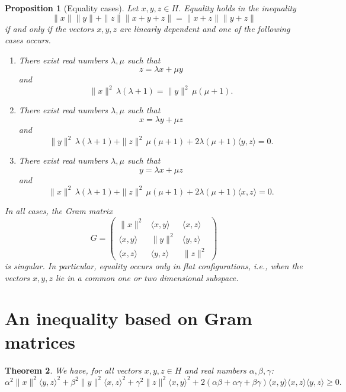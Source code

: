 \documentclass[a4paper,10pt]{article}
\theoremstyle{plain}
\newtheorem{theorem}{Theorem}[section]
\newtheorem{proposition}[theorem]{Proposition}
\theoremstyle{definition}
\theoremstyle{remark}
\begin{document}
\begin{proposition}[Equality cases]
\label{proposition-equality-case}
Let $x,y,z\in H$.
Equality holds in the inequality
\[
\|x\|\|y\|+\|z\|\|x+y+z\|=\|x+z\|\|y+z\|
\]
if and only if the vectors $x,y,z$ are linearly dependent and one of the following cases occurs.

\begin{enumerate}
\item[\textup{(i)}]
There exist real numbers $\lambda,\mu$ such that
\[
z=\lambda x+\mu y
\]
and
\[
\|x\|^{2}\,\lambda(\lambda+1)
=
\|y\|^{2}\,\mu(\mu+1).
\]

\item[\textup{(ii)}]
There exist real numbers $\lambda,\mu$ such that
\[
x=\lambda y+\mu z
\]
and
\[
\|y\|^{2}\,\lambda(\lambda+1)
+
\|z\|^{2}\,\mu(\mu+1)
+
2\lambda(\mu+1)\langle y,z\rangle
=0.
\]

\item[\textup{(iii)}]
There exist real numbers $\lambda,\mu$ such that
\[
y=\lambda x+\mu z
\]
and
\[
\|x\|^{2}\,\lambda(\lambda+1)
+
\|z\|^{2}\,\mu(\mu+1)
+
2\lambda(\mu+1)\langle x,z\rangle
=0.
\]
\end{enumerate}

In all cases, the Gram matrix
\[
G=
\begin{pmatrix}
\|x\|^2 & \langle x,y\rangle & \langle x,z\rangle\\
\langle x,y\rangle & \|y\|^2 & \langle y,z\rangle\\
\langle x,z\rangle & \langle y,z\rangle & \|z\|^2
\end{pmatrix}
\]
is singular. In particular, equality occurs only in flat configurations, i.e.,
when the vectors $x,y,z$ lie in a common one or two dimensional subspace.
\end{proposition}


\section{An inequality based on Gram matrices}
\label{section-3}

\begin{theorem}
We have, for all vectors $x,y,z \in H$ and real numbers $\alpha,\beta,\gamma$:
\[ \alpha^2  \|x\|^2 \langle y, z \rangle^2 + \beta^2 \|y\|^2 \langle x, z \rangle^2 + \gamma^2 \|z\|^2 \langle x, y \rangle^2  + 2  (\alpha\beta + \alpha\gamma + \beta\gamma) \langle x, y\rangle \langle x, z\rangle \langle y, z\rangle \geq 0. \]
\end{theorem}
\end{document}
